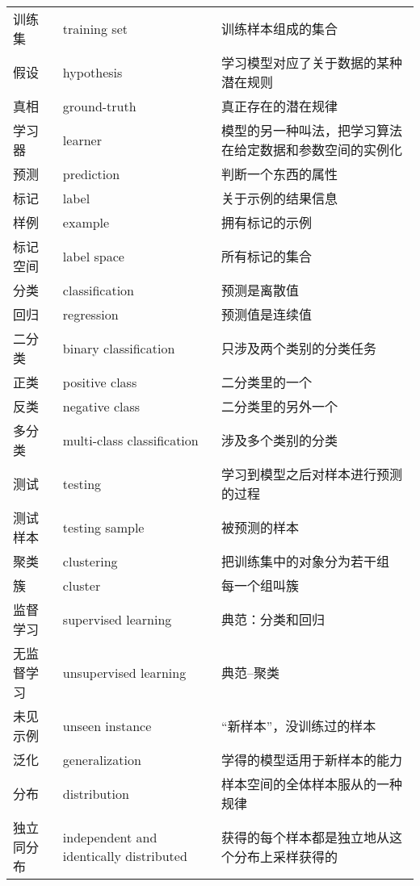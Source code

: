 {\begin{center}
\begin{longtable}{m{3cm}m{5cm}m{7cm}}
        训练集      &   training set        &   训练样本组成的集合      \\
        假设        &   hypothesis          &   学习模型对应了关于数据的某种潜在规则\\
        真相        &   ground-truth        &   真正存在的潜在规律      \\
        学习器      &   learner             &   模型的另一种叫法，把学习算法在给定数据和参数空间的实例化\\
        预测        &   prediction          &   判断一个东西的属性      \\
        标记        &   label               &   关于示例的结果信息      \\
        样例        &   example             &   拥有标记的示例          \\
        标记空间    &   label space         &   所有标记的集合          \\
        分类        &   classification      &   预测是离散值            \\
        回归        &   regression          &   预测值是连续值          \\
        二分类      &   binary classification   &   只涉及两个类别的分类任务    \\
        正类        &   positive class      &   二分类里的一个          \\
        反类        &   negative class      &   二分类里的另外一个          \\
        多分类      &   multi-class classification  &   涉及多个类别的分类  \\
        测试        &   testing             &   学习到模型之后对样本进行预测的过程  \\
        测试样本    &   testing sample      &   被预测的样本    \\
        聚类        &   clustering          &   把训练集中的对象分为若干组  \\
        簇          &   cluster             &   每一个组叫簇            \\
        监督学习    &   supervised learning  &   典范：分类和回归       \\
        无监督学习  &   unsupervised learning  &    典范--聚类          \\
        未见示例    &   unseen instance       &   “新样本”，没训练过的样本    \\
        泛化        &   generalization          &   学得的模型适用于新样本的能力    \\
        分布        &   distribution        &   样本空间的全体样本服从的一种规律\\
        独立同分布  &   independent and identically distributed &   获得的每个样本都是独立地从这个分布上采样获得的  \\
	\end{longtable}
\end{center}

}
